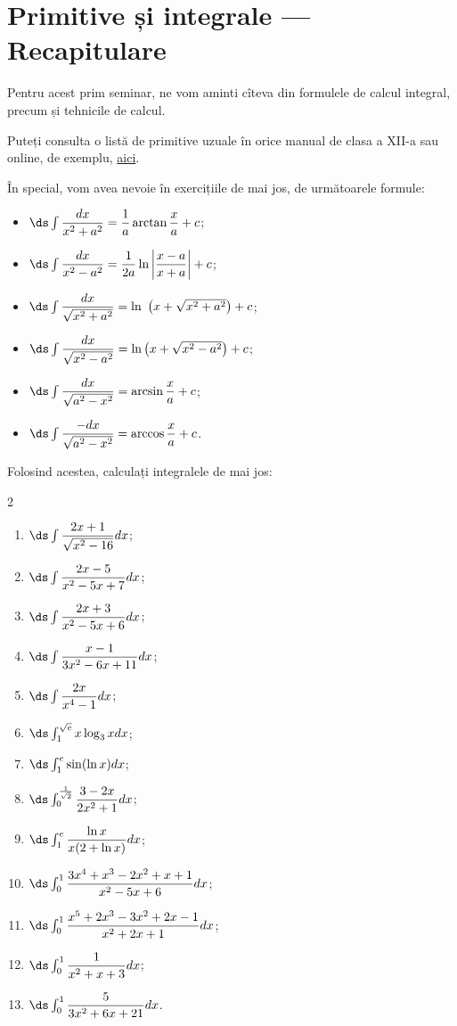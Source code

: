 
\chapter{Primitive și integrale --- Recapitulare}

Pentru acest prim seminar, ne vom aminti cîteva din formulele
de calcul integral, precum și tehnicile de calcul.

Puteți consulta o listă de primitive uzuale în orice manual de
clasa a XII-a sau online, de exemplu, \href{https://ro.wikipedia.org/wiki/Tabel_de_integrale}{aici}.

În special, vom avea nevoie în exercițiile de mai jos, de următoarele formule:

\begin{itemize}
\item $ \ds\int \dfrac{dx}{x^2 + a^2} = \dfrac{1}{a} \arctan \dfrac{x}{a} + c $;
\item $ \ds\int \dfrac{dx}{x^2 - a^2} = \dfrac{1}{2a} \ln \left| \dfrac{x - a}{x + a} \right| + c $;
\item $ \ds\int \dfrac{dx}{\sqrt{x^2 + a^2}} = \ln\ \left( x + \sqrt{x^2 + a^2} \right) + c $;
\item $ \ds\int \dfrac{dx}{\sqrt{x^2 - a^2}} = \ln \left( x + \sqrt{x^2 - a^2} \right) + c $;
\item $ \ds\int \dfrac{dx}{\sqrt{a^2 - x^2}} = \arcsin \dfrac{x}{a} + c $;
\item $ \ds\int \dfrac{-dx}{\sqrt{a^2 - x^2}} = \arccos \dfrac{x}{a} + c $.
\end{itemize}

\newpage

Folosind acestea, calculați integralele de mai jos:

\begin{multicols}{2}
  \begin{enumerate}[(1)]
  \item $ \ds\int \dfrac{2x + 1}{\sqrt{x^2 - 16}} dx $;
  \item $ \ds\int \dfrac{2x - 5}{x^2 - 5x + 7} dx $;
  \item $ \ds\int \dfrac{2x + 3}{x^2 - 5x + 6} dx $;
  \item $ \ds\int \dfrac{x - 1}{3x^2 - 6x + 11} dx $;
  \item $ \ds\int \dfrac{2x}{x^4 - 1} dx $;
  \item $ \ds\int_1^{\sqrt{e}} x \log_3 x dx $;
  \item $ \ds\int_1^e \sin(\ln x) dx $;
  \item $ \ds\int_0^{\frac{1}{\sqrt{2}}} \dfrac{3 - 2x}{2x^2 + 1} dx $;
  \item $ \ds\int_1^e \dfrac{\ln x}{x(2 + \ln x)} dx $;
  \item $ \ds\int_0^1 \dfrac{3x^4 + x^3 - 2x^2 + x + 1}{x^2 - 5x + 6} dx $;
  \item $ \ds\int_0^1 \dfrac{x^5 + 2x^3 - 3x^2 + 2x - 1}{x^2 + 2x + 1} dx $;
  \item $ \ds\int_0^1 \dfrac{1}{x^2 + x + 3} dx $;
  \item $ \ds\int_0^1 \dfrac{5}{3x^2 + 6x + 21} dx $.
  \end{enumerate}
\end{multicols}

